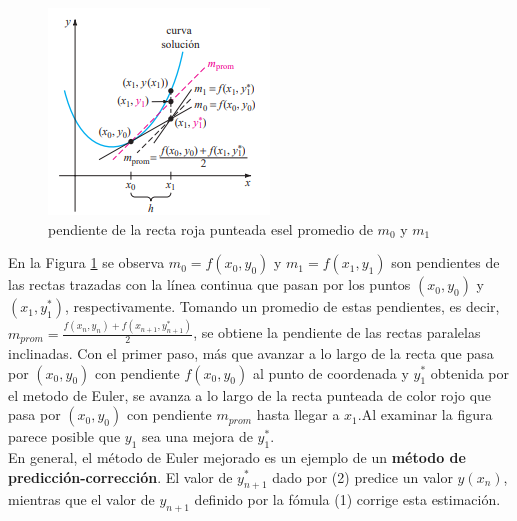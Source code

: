\documentclass[12 pt,letterpaper]{article}
\begin{document}
\begin{itemize}
\begin{figure}[H]
    \centering
    \includegraphics{Pendiente de la recta roja.png}
    \caption{pendiente de la recta roja
punteada esel promedio de $m_{0}$ y $m_{1}$}
    \label{pendiente}
\end{figure}\vspace{0.2Cm}
 \begin{flushleft} 
En la Figura \ref{pendiente} se observa $m_{0}=f(x_{0},y_{0})$  y $m_{1}=f(x_{1},y_{1})$ son pendientes de las rectas trazadas con la línea continua que pasan por los puntos $(x_{0},y_{0})$  y  $(x_{1},y^*_{1})$, respectivamente. Tomando un promedio de estas pendientes, es decir, $m_{prom} =\frac{f(x_{n},y_{n})+f(x_{n+1},y^*_{n+1})}{2}$, se obtiene la pendiente de las rectas paralelas inclinadas.
Con el primer paso, más que avanzar a lo largo de la recta que pasa por $(x_{0},y_{0})$  con pendiente $f(x_{0},y_{0})$  al punto de coordenada y $y^*_{1}$  obtenida por el metodo de Euler, se avanza a lo largo de la recta punteada de color rojo que pasa por $(x_{0},y_{0})$  con pendiente $m_{prom}$  hasta llegar a $x_{1}$.Al examinar la figura parece posible que  $y_{1}$ sea una mejora de  $y^*_{1}$.\\
En general, el método de Euler mejorado es un ejemplo de un \textbf{método de predicción-corrección}. El valor de $y^*_{n+1}$ dado por (2) predice un valor $y(x_{n})$, mientras que el valor de $y_{n+1}$ definido por la fómula (1) corrige esta estimación.\\
\end{flushleft} 
\begin{flushleft}
\fbox{\textcolor{purple}{Ejercicio de aplicación}}\vspace{0.cm}
\end{flushleft}


\end{itemize}
\end{document}
